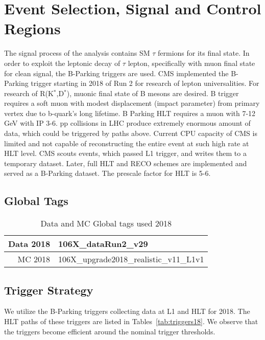\clearpage
\section{Event Selection, Signal and Control Regions}\label{sec:selections}

The signal process of the analysis contains SM $\tau$ fermions for its final state. 
In order to exploit the leptonic decay of $\tau$ lepton, specifically with muon final state for clean signal, the B-Parking triggers are used. 
CMS implemented the B-Parking trigger starting in 2018 of Run 2 for research of lepton universalities. 
For research of R(K$^{*}$,D$^{*}$), muonic final state of B mesons are desired. 
B trigger requires a soft muon with modest displacement (impact parameter) from primary vertex due to b-quark's long lifetime.
B Parking HLT requires a muon with 7-12 GeV with IP 3-6.
pp collisions in LHC produce extremely enormous amount of data, which could be triggered by paths above. 
Current CPU capacity of CMS is limited and not capable of reconstructing the entire event at such high rate at HLT level.
CMS scouts events, which passed L1 trigger, and writes them to a temporary dataset. Later, full HLT and RECO schemes are implemented and served as a B-Parking dataset. 
The prescale factor for HLT is 5-6.


\subsection{Global Tags}
\begin{table}[htb]
\caption{Data and MC Global tags used 2018}
\begin{center}
\begin{tabular}{r|l}\hline
 Data 2018 & 106X\_dataRun2\_v29 \\
 \hline
 MC 2018   & 106X\_upgrade2018\_realistic\_v11\_L1v1 \\
 \hline
\end{tabular}
\label{tab:GT}
\end{center}
\end{table}


\subsection{Trigger Strategy}
We utilize the B-Parking triggers collecting data at L1 and HLT for 2018.
The HLT paths of these triggers are listed in Tables~\ref{tab:triggers18}.
We observe that the triggers become efficient
around the nominal trigger thresholds.

